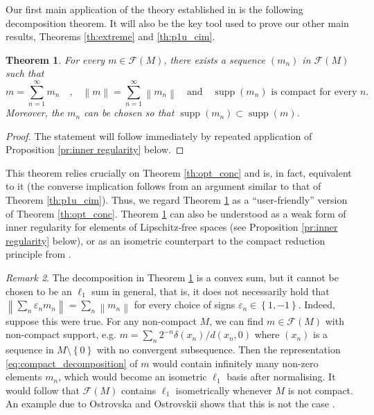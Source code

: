 \documentclass[a4paper,10pt]{amsart}
\DeclareMathOperator{\supp}{supp}                           %
\newcommand{\set}[1]{\left\{{#1}\right\}}                   %
\newcommand{\norm}[1]{\left\|{#1}\right\|}                  %
\newcommand{\lipfree}[1]{\mathcal{F}({#1})}                 %
\theoremstyle{plain}
\newtheorem{theorem}{Theorem}[section]
\theoremstyle{definition}
\theoremstyle{remark}
\newtheorem{remark}[theorem]{Remark}
\begin{document}
Our first main application of the theory established in \cite{Smith24} is the following decomposition theorem. It will also be the key tool used to prove our other main results, Theorems \ref{th:extreme} and \ref{th:p1u_cim}.

\begin{theorem}\label{th:compact_decomposition}
For every $m \in \lipfree{M}$, there exists a sequence $(m_n)$ in $\lipfree{M}$ such that
\begin{equation}\label{eq:compact_decomposition}
m = \sum_{n=1}^\infty m_n \quad\text{,}\quad \norm{m} = \sum_{n=1}^\infty \norm{m_n} \quad\text{and}\quad \text{$\supp(m_n)$ is compact for every $n$.}
\end{equation}
Moreover, the $m_n$ can be chosen so that $\supp(m_n)\subset\supp(m)$.
\end{theorem}

\begin{proof}
The statement will follow immediately by repeated application of Proposition \ref{pr:inner regularity} below.
\end{proof}

This theorem relies crucially on Theorem \ref{th:opt_conc} and is, in fact, equivalent to it (the converse implication follows from an argument similar to that of Theorem \ref{th:p1u_cim}). Thus, we regard Theorem \ref{th:compact_decomposition} as a ``user-friendly'' version of Theorem \ref{th:opt_conc}. Theorem \ref{th:compact_decomposition} can also be understood as a weak form of inner regularity for elements of Lipschitz-free spaces (see Proposition \ref{pr:inner regularity} below), or as an isometric counterpart to the compact reduction principle from \cite{ANPP}.

\begin{remark}
The decomposition in Theorem \ref{th:compact_decomposition} is a convex sum, but it cannot be chosen to be an $\ell_1$ sum in general, that is, it does not necessarily hold that $\norm{\sum_n\varepsilon_nm_n} = \sum_n\norm{m_n}$ for every choice of signs $\varepsilon_n\in\set{1,-1}$. Indeed, suppose this were true. For any non-compact $M$, we can find $m\in\lipfree{M}$ with non-compact support, e.g. $m=\sum_n 2^{-n}\delta(x_n)/d(x_n,0)$ where $(x_n)$ is a sequence in $M\setminus\set{0}$ with no convergent subsequence. Then the representation \eqref{eq:compact_decomposition} of $m$ would contain infinitely many non-zero elements $m_n$, which would become an isometric $\ell_1$ basis after normalising. It would follow that $\lipfree{M}$ contains $\ell_1$ isometrically whenever $M$ is not compact. An example due to Ostrovska and Ostrovskii shows that this is not the case \cite[Theorem 3.1]{OO1}.
\end{remark}
\end{document}
